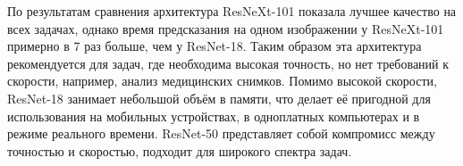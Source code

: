 По результатам сравнения архитектура ResNeXt-101 показала лучшее качество на всех задачах, однако время предсказания на одном изображении у ResNeXt-101 примерно в 7 раз больше, чем у ResNet-18. Таким образом эта архитектура рекомендуется для задач, где необходима высокая точность,  но нет требований к скорости, например, анализ медицинских снимков. Помимо высокой скорости, ResNet-18 занимает небольшой объём в памяти, что делает её пригодной для использования на мобильных устройствах, в одноплатных компьютерах и в режиме реального времени. ResNet-50 представляет собой компромисс между точностью и скоростью, подходит для широкого спектра задач.